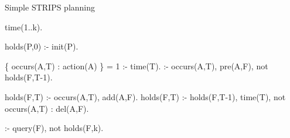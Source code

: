 \begin{frame}[fragile,shrink=1]{Simple STRIPS planning}
\begin{semiverbatim}
time(1..k).

holds(P,0) :- init(P).

\{ occurs(A,T) : action(A) \} = 1 :- time(T).
:- occurs(A,T), pre(A,F), not holds(F,T-1).

holds(F,T) :- occurs(A,T), add(A,F).
holds(F,T) :- holds(F,T-1), time(T), not occurs(A,T) : del(A,F).

:- query(F), not holds(F,k).


\end{semiverbatim}
\end{frame}
%
